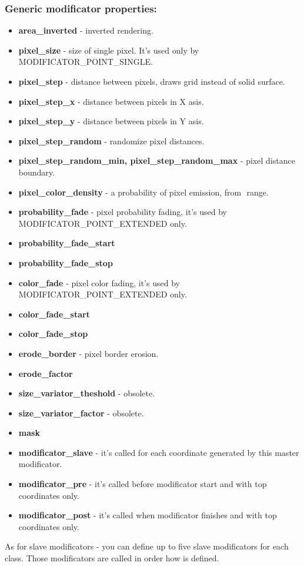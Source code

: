 \documentclass[9pt]{article}
\begin{document}
\subsubsection*{Generic modificator properties:}
\begin{itemize}
\item{\bf area\_inverted} - inverted rendering.
\item{\bf pixel\_size} - size of single pixel. It's used only by MODIFICATOR\_POINT\_SINGLE.
\item{\bf pixel\_step} - distance between pixels, draws grid instead of solid surface.
\item{\bf pixel\_step\_x} - distance between pixels in X asis.
\item{\bf pixel\_step\_y} - distance between pixels in Y asis.
\item{\bf pixel\_step\_random} - randomize pixel distances.
\item{\bf pixel\_step\_random\_min, pixel\_step\_random\_max} - pixel distance boundary. 
\item{\bf pixel\_color\_density} - a probability of pixel emission, from
\begin{math}<0,1>\end{math} range.
\item{\bf probability\_fade} - pixel probability fading, it's used by MODIFICATOR\_POINT\_EXTENDED only.
\item{\bf probability\_fade\_start}
\item{\bf probability\_fade\_stop}
\item{\bf color\_fade} - pixel color fading, it's used by MODIFICATOR\_POINT\_EXTENDED only.
\item{\bf color\_fade\_start}
\item{\bf color\_fade\_stop}
\item{\bf erode\_border} - pixel border erosion.
\item{\bf erode\_factor}
\item{\bf size\_variator\_theshold} - obsolete.
\item{\bf size\_variator\_factor} - obsolete.
\item{\bf mask}
\end{itemize}
\begin{itemize}
\item{\bf modificator\_slave} - it's called for each coordinate generated 
by this master modificator.
\item{\bf modificator\_pre} - it's called before modificator start 
and with top coordinates only.
\item{\bf modificator\_post} - it's called when modificator finishes 
and with top coordinates only.
\end{itemize}
As for slave modificators - you can define up to five slave modificators for each class.
Those modificators are called in order how is defined.
\end{document}
